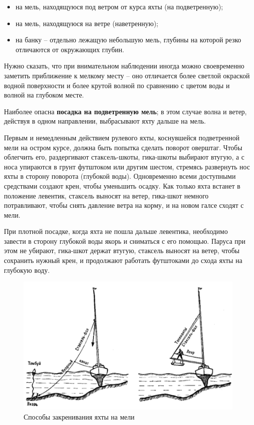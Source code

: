 \documentclass[a4paper, 12pt, twoside, final]{scrbook}
\begin{document}
\begin{itemize}
\item на мель, находящуюся под ветром от курса яхты (на подветренную);
\item на мель, находящуюся на ветре (наветренную);
\item на банку \--- отдельно лежащую небольшую мель, глубины на которой резко отличаются от окружающих глубин.
\end{itemize}

Нужно сказать, что при внимательном наблюдении иногда можно своевременно заметить приближение к мелкому месту \--- оно отличается более светлой окраской водной поверхности и более крутой волной по сравнению с цветом воды и волной на глубоком месте.

Наиболее опасна \textbf{посадка на подветренную мель}; в этом случае волна и ветер, действуя в одном направлении, выбрасывают яхту дальше на мель.

Первым и немедленным действием рулевого яхты, коснувшейся подветренной мели на остром курсе, должна быть попытка сделать поворот оверштаг. Чтобы облегчить его, раздергивают стаксель-шкоты, гика-шкоты выбирают втугую, а с носа упираются в грунт футштоком или другим шестом, стремясь развернуть нос яхты в сторону поворота (глубокой воды). Одновременно всеми доступными средствами создают крен, чтобы уменьшить осадку. Как только яхта встанет в положение левентик, стаксель выносят на ветер, гика-шкот немного потравливают, чтобы снять давление ветра на корму, и на новом галсе сходят с мели.

При плотной посадке, когда яхта не пошла дальше левентика, необходимо завести в сторону глубокой воды якорь и сниматься с его помощью. Паруса при этом не убирают, гика-шкот держат втугую, стаксель выносят на ветер, чтобы сохранить нужный крен, и продолжают работать футштоками до схода яхты на глубокую воду.

\begin{figure}[htbp]
   \centering
   \includegraphics{139_Zakren_na_meli} %
   \caption{Способы закренивания яхты на мели}
   \label{fig:139}
\end{figure}
\end{document}
